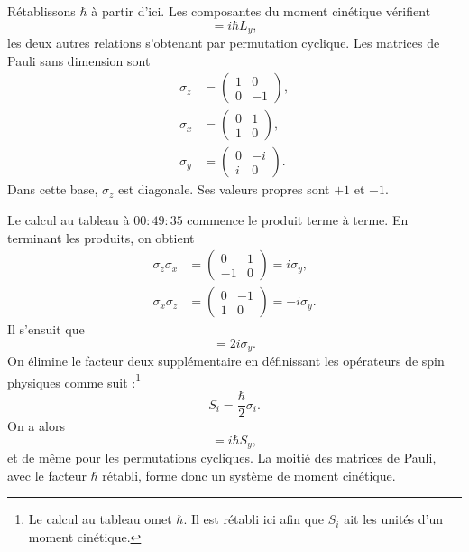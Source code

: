 Rétablissons \(\hbar\) à partir d’ici. Les composantes du moment cinétique vérifient
\begin{equation}
[L_{z},L_{x}]=i\hbar L_{y},
\end{equation}
les deux autres relations s’obtenant par permutation cyclique. Les matrices de Pauli sans dimension sont
\begin{equation}
\begin{aligned}
\sigma_{z}&=
\begin{pmatrix}
1&0\\
0&-1
\end{pmatrix},\\[0.4em]
\sigma_{x}&=
\begin{pmatrix}
0&1\\
1&0
\end{pmatrix},\\[0.4em]
\sigma_{y}&=
\begin{pmatrix}
0&-i\\
i&0
\end{pmatrix}.
\end{aligned}
\end{equation}
Dans cette base, \(\sigma_{z}\) est diagonale. Ses valeurs propres sont \(+1\) et
\(-1\).

\begin{classroomqa}
\end{classroomqa}

Le calcul au tableau à \(00{:}49{:}35\) commence le produit terme à terme. En terminant les produits, on obtient
\begin{align}
\sigma_{z}\sigma_{x}
&=
\begin{pmatrix}
0&1\\
-1&0
\end{pmatrix}
=i\sigma_{y},\\
\sigma_{x}\sigma_{z}
&=
\begin{pmatrix}
0&-1\\
1&0
\end{pmatrix}
=-i\sigma_{y}.
\end{align}
Il s’ensuit que
\begin{equation}
[\sigma_{z},\sigma_{x}]=2i\sigma_{y}.
\end{equation}
On élimine le facteur deux supplémentaire en définissant les opérateurs de spin physiques comme suit :\footnote{Le calcul au tableau omet \(\hbar\). Il est rétabli ici afin que \(S_i\) ait les unités d’un moment cinétique.}
\begin{equation}
S_{i}=\frac{\hbar}{2}\sigma_{i}.
\end{equation}
On a alors
\begin{equation}
[S_{z},S_{x}]=i\hbar S_{y},
\end{equation}
et de même pour les permutations cycliques. La moitié des matrices de Pauli, avec le facteur \(\hbar\) rétabli, forme donc un système de moment cinétique.

